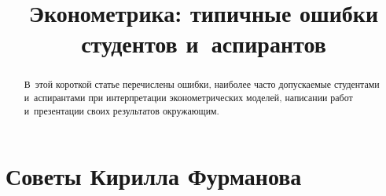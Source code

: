 \documentclass[final,pdftex]{../../template/epsilonj}
\begin{document}
\begin{frontmatter}
\title{Эконометрика: типичные ошибки студентов и~аспирантов}

\begin{aug}
\author{ }%
\author{ }


\address{НИУ ВШЭ, Москва.}
\end{aug}

\begin{abstract}
В~этой короткой статье перечислены ошибки, наиболее часто допускаемые студентами и~аспирантами при интерпретации эконометрических моделей, написании работ и~презентации своих результатов окружающим.
\end{abstract}

\begin{keyword}
\end{keyword}

\end{frontmatter}


\section{Советы Кирилла Фурманова}
\end{document}
